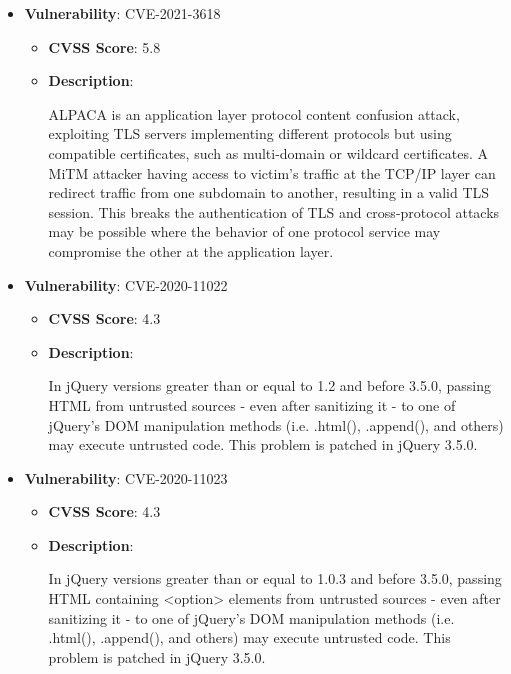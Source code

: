 \documentclass{article}
\begin{document}
\begin{itemize}
        \item \textbf{Vulnerability}: CVE-2021-3618
        \begin{itemize}
            \item \textbf{CVSS Score}:  5.8 
            \item \textbf{Description}:
            \parbox[t]{0.9\linewidth}{
                \ttfamily ALPACA is an application layer protocol content confusion attack, exploiting TLS servers implementing different protocols but using compatible certificates, such as multi-domain or wildcard certificates. A MiTM attacker having access to victim's traffic at the TCP/IP layer can redirect traffic from one subdomain to another, resulting in a valid TLS session. This breaks the authentication of TLS and cross-protocol attacks may be possible where the behavior of one protocol service may compromise the other at the application layer.
            }
        \end{itemize}
    
        \item \textbf{Vulnerability}: CVE-2020-11022
        \begin{itemize}
            \item \textbf{CVSS Score}:  4.3 
            \item \textbf{Description}:
            \parbox[t]{0.9\linewidth}{
                \ttfamily In jQuery versions greater than or equal to 1.2 and before 3.5.0, passing HTML from untrusted sources - even after sanitizing it - to one of jQuery's DOM manipulation methods (i.e. .html(), .append(), and others) may execute untrusted code. This problem is patched in jQuery 3.5.0.
            }
        \end{itemize}
    
        \item \textbf{Vulnerability}: CVE-2020-11023
        \begin{itemize}
            \item \textbf{CVSS Score}:  4.3 
            \item \textbf{Description}:
            \parbox[t]{0.9\linewidth}{
                \ttfamily In jQuery versions greater than or equal to 1.0.3 and before 3.5.0, passing HTML containing <option> elements from untrusted sources - even after sanitizing it - to one of jQuery's DOM manipulation methods (i.e. .html(), .append(), and others) may execute untrusted code. This problem is patched in jQuery 3.5.0.
            }
        \end{itemize}
    
\end{itemize}
\end{document}
